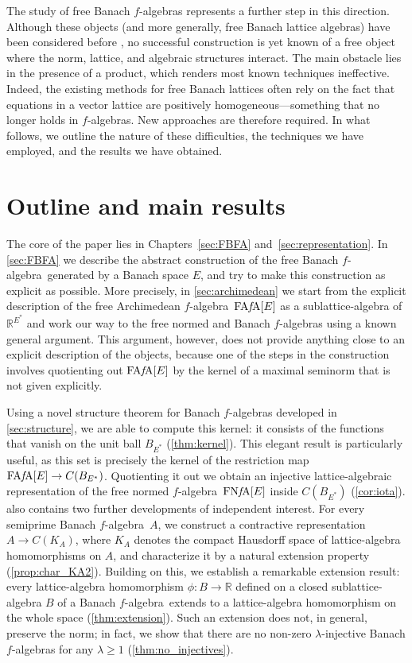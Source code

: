 \documentclass{memo-l}
\theoremstyle{definition}
\theoremstyle{remark}
\numberwithin{section}{chapter}
\numberwithin{equation}{chapter}
\newcommand\R{\ensuremath{\mathbb{R}}}
\newcommand{\falg}{$f\!$-algebra}
\newcommand{\FAFAv}[1]{\operatorname{FA{\it f}\!A}[#1]}
\newcommand{\FNFA}[1]{\operatorname{FN{\it f}\!A}[#1]}
\begin{document}
The study of free Banach \falg s represents a further step in this
direction. Although these objects (and more generally, free Banach lattice
algebras) have been considered before
\cite{de_jeu2021,wickstead2017_questions}, no successful construction is yet
known of a free object where the norm, lattice, and algebraic
structures interact. The main obstacle lies in the presence
of a product, which renders most known techniques ineffective. Indeed,
the existing methods for free Banach lattices often rely on the fact that equations in a vector lattice are
positively homogeneous---something that no longer holds in \falg s.
New approaches are therefore required. In what follows, we outline the
nature of these difficulties, the techniques we have employed, and the
results we have obtained.

\section*{Outline and main results}

The core of the paper lies in Chapters~\ref{sec:FBFA}
and~\ref{sec:representation}. In \cref{sec:FBFA} we describe the
abstract construction of the free Banach \falg\ generated by a Banach
space $E$, and try to make this construction as explicit as possible. More
precisely, in \cref{sec:archimedean} we start from the explicit description of the free
Archimedean \falg\ $\FAFAv E$ as a sublattice-algebra of $\R^{E^{*}}$
and work our
way to the free normed and Banach \falg s using a known
general argument. This argument, however, does not provide anything
close to an explicit description of the objects, because one of the steps in
the construction
involves quotienting out $\FAFAv E$ by the kernel of a maximal seminorm
that is not given explicitly.

Using a novel structure theorem for Banach \falg s developed in
\cref{sec:structure}, we are able to compute this kernel:
it consists of the functions that vanish on the
unit ball $B_{E^{*}}$ (\cref{thm:kernel}). This elegant result is
particularly useful, as this
set is precisely the kernel of the restriction map $\FAFAv E\to
C(B_{E^{*}})$. Quotienting it out we obtain an injective lattice-algebraic
representation of the free normed \falg\ $\FNFA E$ inside
$C(B_{E^{*}})$ (\cref{cor:iota}).  also contains
two further developments of independent interest. For every semiprime
Banach \falg\ $A$, we construct a contractive representation $A\to
C(K_A)$, where $K_A$ denotes the compact Hausdorff space of
lattice-algebra homomorphisms on $A$, and characterize it by a natural
extension property (\cref{prop:char_KA2}). Building on this, we
establish a remarkable extension result: every lattice-algebra
homomorphism $\phi \colon B\to \R$ defined on a closed
sublattice-algebra $B$ of a Banach \falg\ extends to a lattice-algebra
homomorphism on the whole space (\cref{thm:extension}). Such an
extension does not, in general, preserve the norm; in fact, we show
that there are no non-zero $\lambda $-injective Banach \falg s for any
$\lambda \ge 1$ (\cref{thm:no_injectives}).
\end{document}
